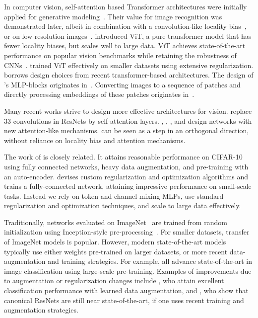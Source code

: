 In computer vision, self-attention based Transformer architectures were initially applied for generative modeling~\cite{child2019-sparsetransformers,parmar18-imagetransformer}.
Their value for image recognition was demonstrated later, albeit in combination with a convolution-like locality bias~\cite{ramachandran19-sasa}, or on 
low-resolution images~\cite{cordonnier2020-sacnn}.
\citet{Dosovitskiy2021} introduced ViT, a pure transformer model that has fewer locality biases, but scales well to large data. 
ViT achieves state-of-the-art performance on popular vision benchmarks while retaining the robustness 
of CNNs~\cite{bhojanapalli2021understanding}. 
\citet{deit} trained ViT effectively on smaller datasets using extensive regularization.
\name{} borrows design choices from recent transformer-based architectures.
The design of \name{}'s MLP-blocks originates in~\citet{vaswani2017}.
Converting images to a sequence of patches and directly processing embeddings of these patches originates in~\citet{Dosovitskiy2021}.

Many recent works strive to design more effective architectures for vision. 
\citet{srinivas2021bottleneck} replace 33 convolutions in ResNets by self-attention layers.
\citet{ramachandran19-sasa}, \citet{tay20synthesizer}, \citet{li2021involution}, and \citet{bello2021lambdanetworks} design networks
with new attention-like mechanisms. 
\name{} can be seen as a step in an orthogonal direction, without reliance on locality bias and attention mechanisms.

The work of \citet{lin2016mlp} is closely related.
It attains reasonable performance on CIFAR-10 using fully connected networks, heavy data augmentation, and pre-training with an auto-encoder.
\citet{neyshabur2020towards} devises custom regularization and optimization algorithms and trains a fully-connected network, attaining impressive performance on small-scale
tasks.
Instead we rely on token and channel-mixing MLPs, use standard regularization and optimization techniques, and scale to large data effectively. 

Traditionally, networks evaluated on ImageNet~\citep{deng2009-imagenet} are trained from random initialization using Inception-style pre-processing~\citep{inception}.
For smaller datasets, transfer of ImageNet models is popular.
However, modern state-of-the-art models typically use either weights pre-trained on larger datasets, or more recent data-augmentation and training strategies.
For example, \citet{Dosovitskiy2021,kolesnikov2020-bit,mahajan2018,pham2020meta,xie2020-noisystudent} all advance state-of-the-art in image classification using large-scale pre-training.
Examples of improvements due to augmentation or regularization changes include \citet{autoaugment}, who attain excellent classification performance with learned data augmentation, and \citet{bello2021revisiting}, who show that canonical ResNets are still near state-of-the-art, if one uses recent training and augmentation strategies.

